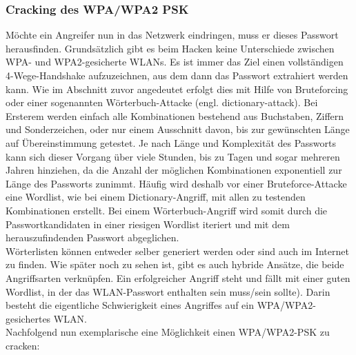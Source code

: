 \subsubsection{Cracking des WPA/WPA2 PSK}
 Möchte ein Angreifer nun in das Netzwerk eindringen, muss er dieses Passwort herausfinden. Grundsätzlich gibt es beim Hacken keine Unterschiede zwischen WPA- und WPA2-gesicherte WLANs. Es ist immer das Ziel einen vollständigen 4-Wege-Handshake  aufzuzeichnen, aus dem dann das Passwort extrahiert werden kann. Wie im Abschnitt zuvor angedeutet erfolgt dies mit Hilfe von Bruteforcing oder einer sogenannten Wörterbuch-Attacke (engl. dictionary-attack). Bei Ersterem werden einfach alle Kombinationen bestehend aus Buchstaben, Ziffern und Sonderzeichen, oder nur einem Ausschnitt davon, bis zur gewünschten Länge auf Übereinstimmung getestet. Je nach Länge und Komplexität des Passworts kann sich dieser Vorgang über viele Stunden, bis zu Tagen und sogar mehreren Jahren hinziehen, da die Anzahl der möglichen Kombinationen exponentiell zur Länge des Passworts zunimmt. Häufig wird deshalb vor einer Bruteforce-Attacke eine Wordlist, wie bei einem Dictionary-Angriff, mit allen zu testenden Kombinationen erstellt. Bei einem Wörterbuch-Angriff wird somit durch die Passwortkandidaten in einer riesigen Wordlist iteriert und mit dem herauszufindenden Passwort abgeglichen. \\
Wörterlisten können entweder selber generiert werden oder sind auch im Internet zu finden. Wie  später noch zu sehen ist, gibt es auch hybride Ansätze, die beide Angriffsarten verknüpfen. Ein erfolgreicher Angriff steht und fällt mit einer guten Wordlist, in der das WLAN-Passwort enthalten sein muss/sein sollte). Darin besteht die eigentliche Schwierigkeit eines Angriffes auf ein WPA/WPA2-gesichertes WLAN. \\
Nachfolgend nun exemplarische eine Möglichkeit einen WPA/WPA2-PSK zu cracken:

